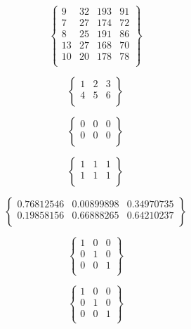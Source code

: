 \documentclass[UTF8,16pt]{ctexart}
\begin{document}
{\color{white} \huge
$$
\left\{
 \begin{matrix}
   9 & 32 & 193 & 91\\
   7 & 27 & 174 & 72\\
   8 & 25 & 191 & 86\\
   13 & 27 & 168 & 70\\
   10 & 20 & 178 & 78\\
  \end{matrix}
  \right\} 
$$
 }

{\color{white} \Huge
$$
\left\{
 \begin{matrix}
   1 & 2 & 3\\
   4 & 5 & 6\\
  \end{matrix}
  \right\} 
$$
 }

{\color{white} \Huge
$$
\left\{
 \begin{matrix}
   0 & 0 & 0\\
   0 & 0 & 0\\
  \end{matrix}
  \right\} 
$$
 }

{\color{white} \Huge
$$
\left\{
 \begin{matrix}
   1 & 1 & 1\\
   1 & 1 & 1\\
  \end{matrix}
  \right\} 
$$
 }

{\color{white} \Huge
$$
\left\{
 \begin{matrix}
   0.76812546 & 0.00899898 & 0.34970735\\
   0.19858156 & 0.66888265 & 0.64210237\\
  \end{matrix}
  \right\} 
$$
 }

{\color{white} \Huge
$$
\left\{
 \begin{matrix}
   1 & 0 & 0\\
   0 & 1 & 0\\
   0 & 0 & 1\\
  \end{matrix}
  \right\} 
$$
 }

{\color{white} \Huge
$$
\left\{
 \begin{matrix}
   1 & 0 & 0\\ 

   0 & 1 & 0\\

   0 & 0 & 1\\
  \end{matrix}
  \right\} 
$$
 }
\end{document}
